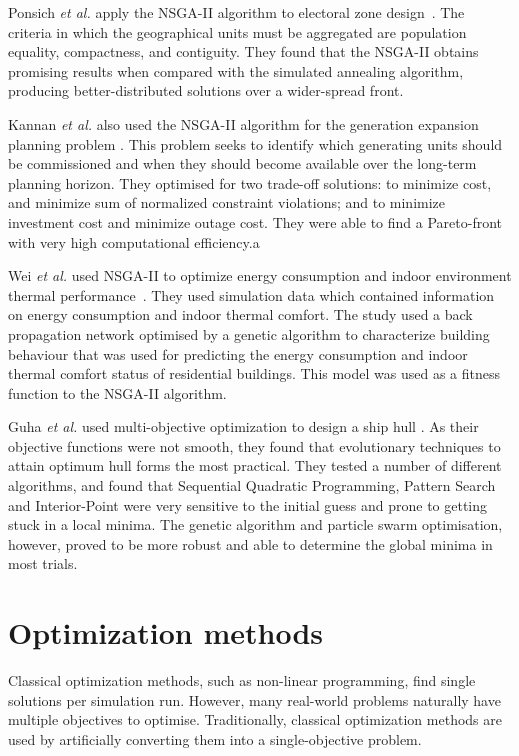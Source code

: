 \documentclass[10pt, conference, compsocconf]{IEEEtran}
\begin{document}
Ponsich \textit{et al.} apply the NSGA-II algorithm to electoral zone design~\cite{Ponsich2017}. The criteria in which the geographical units must be aggregated are population equality, compactness, and contiguity. They found that the NSGA-II obtains promising results when compared with the simulated annealing algorithm, producing better-distributed solutions over a wider-spread front.

Kannan \textit{et al.} also used the NSGA-II algorithm for the generation expansion planning problem  \cite{Kannan2009}. This problem seeks to identify which generating units should be commissioned and when they should become available over the long-term planning horizon. They optimised for two trade-off solutions: to minimize cost, and minimize sum of normalized constraint violations; and to minimize investment cost and minimize outage cost. They  were able to find a Pareto-front with very high computational efficiency.a

Wei \textit{et al.} used NSGA-II to optimize energy consumption and indoor environment thermal performance~\cite{Yu2015a}. They used simulation data which contained information on energy consumption and indoor thermal comfort. The study used a back propagation network optimised by a genetic algorithm to characterize building behaviour that was used for predicting the energy consumption and indoor thermal comfort status of residential buildings. This model was used as a fitness function to the NSGA-II algorithm.

Guha \textit{et al.} used multi-objective optimization to design a ship hull \cite{Guha2015}. As their objective functions were not smooth, they found that evolutionary techniques to attain optimum hull forms the most practical. They tested a number of different algorithms, and found that Sequential Quadratic Programming, Pattern Search and Interior-Point were very sensitive to the initial guess and prone to getting stuck in a local minima. The genetic algorithm and particle swarm optimisation, however, proved to be more robust and able to determine the global minima in most trials.

\section{Optimization methods}
\label{method}

Classical optimization methods, such as non-linear programming, find single solutions per simulation run. However, many real-world problems naturally have multiple objectives to optimise. Traditionally, classical optimization methods are used by artificially converting them into a single-objective problem. 
\end{document}
